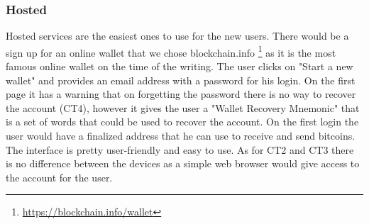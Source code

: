 \subsubsection{Hosted}
Hosted services are the easiest ones to use for the new users. There would be a sign up for an online wallet that we chose blockchain.info \footnote{\url{https://blockchain.info/wallet}} as it is the most famous online wallet on the time of the writing. The user clicks on "Start a new wallet" and provides an email address with a password for his login. On the first page it has a warning that on forgetting the password there is no way to recover the account (CT4), however it gives the user a "Wallet Recovery Mnemonic" that is a set of words that could be used to recover the account. On the first login the user would have a finalized address that he can use to receive and send bitcoins. The interface is pretty user-friendly and easy to use. As for CT2 and CT3 there is no difference between the devices as a simple web browser would give access to the account for the user.
